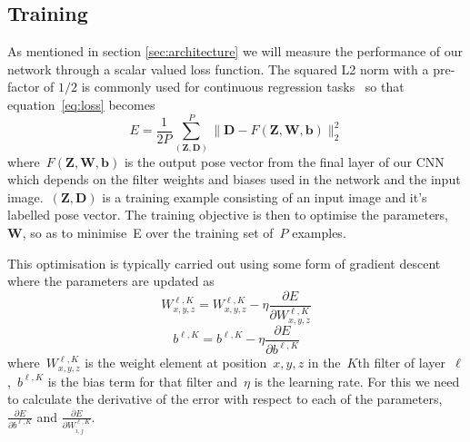\documentclass[11pt]{article} %
\DeclareMathOperator*{\argmin}{arg\,min}
\begin{document}
\subsection{Training}

As mentioned in section \ref{sec:architecture} we will measure the performance of our network through a scalar valued loss function. The squared L2 norm with a pre-factor of $1/2$ is commonly used for continuous regression tasks~\cite{Pfister,Li2014,Toshev} so that equation~\ref{eq:loss} becomes 
\begin{equation}
E=\frac{1}{2P} \sum_{(\boldsymbol{Z},\boldsymbol{D})}^{P}\|\boldsymbol{D}-F(\boldsymbol{Z},\boldsymbol{W},\boldsymbol{b})\|^2_2
\label{eq:loss}
\end{equation}
where~$F(\boldsymbol{Z},\boldsymbol{W},\boldsymbol{b})$ is the output pose vector from the final layer of our CNN which depends on the filter weights and biases used in the network and the input image.~$(\boldsymbol{Z},\boldsymbol{D})$ is a training example consisting of an input image and it's labelled pose vector. The training objective is then to optimise the parameters,~$\boldsymbol{W}$, so as to minimise~E over the training set of~$P$ examples. 



This optimisation is typically carried out using some form of gradient descent where the parameters are updated as
\begin{equation}
W^{\ell,K}_{x,y,z}=W^{\ell,K}_{x,y,z}-\eta \frac{\partial E}{\partial W^{\ell,K}_{x,y,z}}
\label{eq:gradientDescentW}
\end{equation}
\begin{equation}
b^{\ell,K}=b^{\ell,K}-\eta \frac{\partial E}{\partial b^{\ell,K}}
\label{eq:gradientDescentB}
\end{equation}
where~$W^{\ell,K}_{x,y,z}$ is the weight element at position~$x,y,z$ in the~$K$th filter of layer~$\ell$,~$b^{\ell,K}$ is the bias term for that filter and~$\eta$ is the learning rate.
For this we need to calculate the derivative of the error with respect to each of the parameters,~$\frac{\partial E}{\partial b^{\ell,K}}$ and $\frac{\partial E}{\partial W^{\ell,K}_{i,j}}$. 
\end{document}
